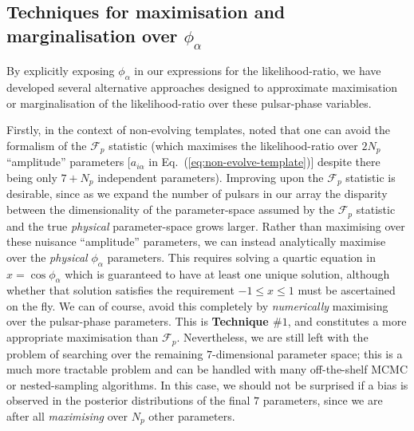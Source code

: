 \documentclass[prd,twocolumn,showpacs,nofootinbib]{revtex4}
\begin{document}
\subsection{Techniques for maximisation and marginalisation over $\phi_{\alpha}$}

By explicitly exposing $\phi_{\alpha}$ in our expressions for the likelihood-ratio, we have developed several alternative approaches designed to approximate maximisation or marginalisation of the likelihood-ratio over these pulsar-phase variables. 

Firstly, in the context of non-evolving templates, \citet{ellisoptimal2012} noted that one can avoid the formalism of the $\mathcal{F}_p$ statistic (which maximises the likelihood-ratio over $2N_{p}$ ``amplitude'' parameters [$a_{i\alpha}$ in Eq.\ (\ref{eq:non-evolve-template})] despite there being only $7+N_{p}$ independent parameters). %
Improving upon the $\mathcal{F}_p$ statistic is desirable, since as we expand the number of pulsars in our array the disparity between the dimensionality of the parameter-space assumed by the $\mathcal{F}_p$ statistic and the true {\it physical} parameter-space grows larger. Rather than maximising over these nuisance ``amplitude'' parameters, we can instead analytically maximise over the {\it physical} $\phi_{\alpha}$ parameters. This requires solving a quartic equation in $x=\cos\phi_{\alpha}$ which is guaranteed to have at least one unique solution, although whether that solution satisfies the requirement $-1 \leq x \leq 1$ must be ascertained on the fly. We can of course, avoid this completely by \textit{numerically} maximising over the pulsar-phase parameters. This is {\bf Technique $\#1$}, and constitutes a more appropriate maximisation than $\mathcal{F}_p$. Nevertheless, we are still left with the problem of searching over the remaining $7$-dimensional parameter space; this is a much more tractable problem and can be handled with many off-the-shelf MCMC or nested-sampling algorithms. In this case, we should not be surprised if a bias is observed in the posterior distributions of the final $7$ parameters, since we are after all \textit{maximising} over $N_p$ other parameters. %
\end{document}
